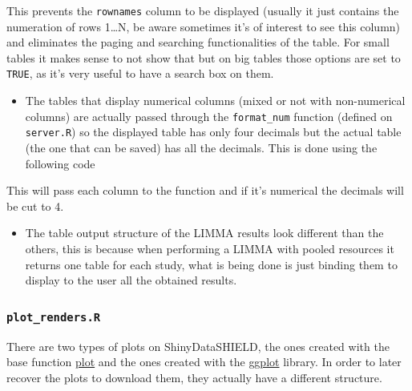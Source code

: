 \documentclass[
]{book}
\newenvironment{Shaded}{\begin{snugshade}}{\end{snugshade}}
\newcommand{\KeywordTok}[1]{\textcolor[rgb]{0.13,0.29,0.53}{\textbf{#1}}}
\newcommand{\NormalTok}[1]{#1}
\newcommand{\OperatorTok}[1]{\textcolor[rgb]{0.81,0.36,0.00}{\textbf{#1}}}
\providecommand{\tightlist}{%
  \setlength{\itemsep}{0pt}\setlength{\parskip}{0pt}}
\begin{document}
This prevents the \texttt{rownames} column to be displayed (usually it just contains the numeration of rows 1\ldots N, be aware sometimes it's of interest to see this column) and eliminates the paging and searching functionalities of the table. For small tables it makes sense to not show that but on big tables those options are set to \texttt{TRUE}, as it's very useful to have a search box on them.

\begin{itemize}
\tightlist
\item
  The tables that display numerical columns (mixed or not with non-numerical columns) are actually passed through the \texttt{format\_num} function (defined on \texttt{server.R}) so the displayed table has only four decimals but the actual table (the one that can be saved) has all the decimals. This is done using the following code
\end{itemize}

\begin{Shaded}
\end{Shaded}

This will pass each column to the function and if it's numerical the decimals will be cut to 4.

\begin{itemize}
\tightlist
\item
  The table output structure of the LIMMA results look different than the others, this is because when performing a LIMMA with pooled resources it returns one table for each study, what is being done is just binding them to display to the user all the obtained results.
\end{itemize}

\hypertarget{plot_renders.r}{%
\subsubsection{\texorpdfstring{\texttt{plot\_renders.R}}{plot\_renders.R}}\label{plot_renders.r}}

There are two types of plots on ShinyDataSHIELD, the ones created with the base function \href{https://www.rdocumentation.org/packages/graphics/versions/3.6.2/topics/plot}{plot} and the ones created with the \href{https://ggplot2.tidyverse.org/}{ggplot} library. In order to later recover the plots to download them, they actually have a different structure.
\end{document}
